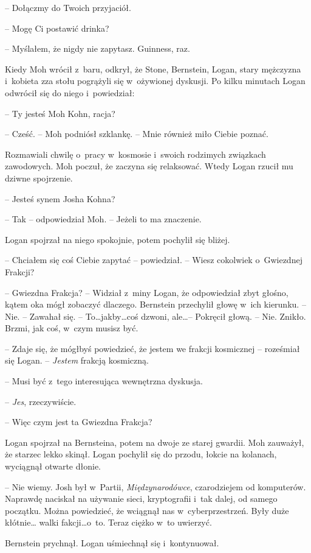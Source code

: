 \documentclass[oneside,polish,11pt,sfheadings]{mwbk}
\begin{document}
-- Dołączmy do Twoich
przyjaciół.

-- Mogę Ci postawić drinka?

-- Myślałem, że nigdy nie zapytasz. Guinness, raz.

Kiedy Moh wrócił z~baru, odkrył, że Stone, Bernstein, Logan, stary
mężczyzna i~kobieta zza stołu pogrążyli się w~ożywionej dyskusji. Po
kilku minutach Logan odwrócił się do niego i~powiedział: 

-- Ty jesteś Moh
Kohn, racja?

-- Cześć. -- Moh podniósł szklankę. -- Mnie również miło Ciebie poznać.

Rozmawiali chwilę o~pracy w~kosmosie i~swoich rodzimych związkach
zawodowych. Moh poczuł, że zaczyna się relaksować. Wtedy Logan rzucił mu
dziwne spojrzenie.

-- Jesteś synem Josha Kohna?

-- Tak -- odpowiedział Moh. -- Jeżeli to ma znaczenie.

Logan spojrzał na niego spokojnie, potem pochylił się bliżej. 

-- Chciałem
się coś Ciebie zapytać -- powiedział. -- Wiesz cokolwiek o~Gwiezdnej
Frakcji?

-- Gwiezdna Frakcja? -- Widział z~miny Logan, że odpowiedział zbyt głośno,
kątem oka mógł zobaczyć dlaczego. Bernstein przechylił głowę w~ich
kierunku. -- Nie. -- Zawahał się. -- To\ldots jakby\ldots coś dzwoni, ale\ldots -- Pokręcił głową. -- Nie. Znikło. Brzmi, jak coś, w~czym musisz być.

-- Zdaje się, że mógłbyś powiedzieć, że jestem we frakcji kosmicznej -- roześmiał się Logan. -- \emph{Jestem} frakcją kosmiczną.

-- Musi być z~tego interesująca wewnętrzna dyskusja.

-- \emph{Jes}, rzeczywiście.

-- Więc czym jest ta Gwiezdna Frakcja?

Logan spojrzał na Bernsteina, potem na dwoje ze starej gwardii. Moh
zauważył, że starzec lekko skinął. Logan pochylił się do przodu, łokcie
na kolanach, wyciągnął otwarte dłonie. 

-- Nie wiemy. Josh był w~Partii,
\emph{Międzynarodówce}, czarodziejem od komputerów. Naprawdę naciskał na
używanie sieci, kryptografii i~tak dalej, od samego początku. Można
powiedzieć, że wciągnął nas w~cyberprzestrzeń. Były duże kłótnie\ldots
walki fakcji\ldots o~to. Teraz ciężko w~to uwierzyć.

Bernstein prychnął. Logan uśmiechnął się i~kontynuował. 
\end{document}
